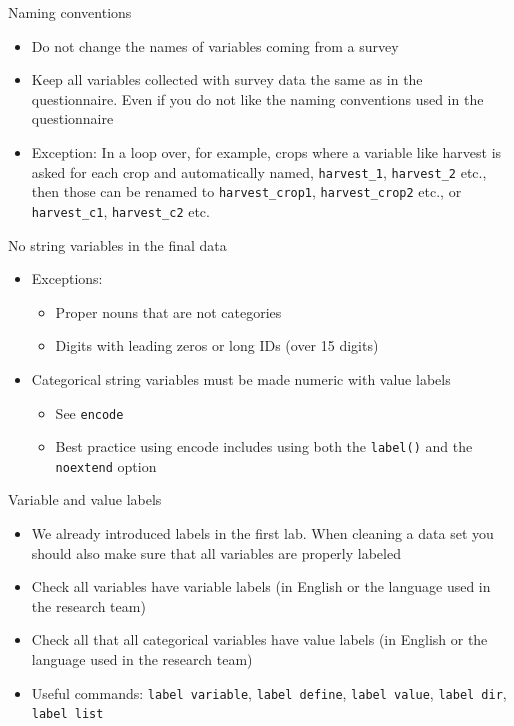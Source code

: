 \documentclass[aspectratio=169]{beamer}
\begin{document}
\begin{frame}{Naming conventions}
	\begin{itemize}
		\item Do not change the names of variables coming from a survey
		\item Keep all variables collected with survey data the same as in the questionnaire. Even if you do not like the naming conventions used in the questionnaire
		\item Exception: In a loop over, for example, crops where a variable like harvest is asked for each crop and automatically named, \texttt{harvest\_1}, \texttt{harvest\_2} etc., then those can be renamed to \texttt{harvest\_crop1}, \texttt{harvest\_crop2} etc., or \texttt{harvest\_c1}, \texttt{harvest\_c2} etc.
	\end{itemize}
\end{frame}

\begin{frame}{No string variables in the final data }
	\begin{itemize}
		\item Exceptions:
		\begin{itemize}
			\item Proper nouns that are not categories
			\item Digits with leading zeros or long IDs (over 15 digits)
		\end{itemize}
		\item Categorical string variables must be made numeric with value labels
		\begin{itemize}
			\item See \texttt{encode}
			\item Best practice using encode includes using both the \texttt{label()} and the \texttt{noextend} option
		\end{itemize}
	\end{itemize}
\end{frame}

\begin{frame}{Variable and value labels }
	\begin{itemize}
		\item We already introduced labels in the first lab. When cleaning a data set you should also make sure that all variables are properly labeled
		\item Check all variables have variable labels (in English or the language used in the research team)
		\item Check all that all categorical variables have value labels (in English or the language used in the research team)
		\item Useful commands: \texttt{label variable}, \texttt{label define}, \texttt{label value}, \texttt{label dir}, \texttt{label list}
	\end{itemize}
\end{frame}
\end{document}
